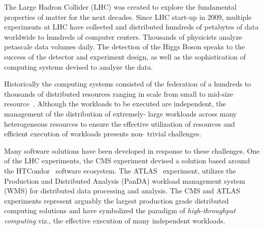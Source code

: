 The Large Hadron Collider (LHC) was created to explore the fundamental
properties of matter for the next decades.  Since LHC start-up in 2009,
multiple experiments  at LHC have collected and distributed hundreds of
petabytes of data worldwide to hundreds of computer centers. Thousands of
physicists analyze petascale data volumes daily. The detection of the Higgs
Boson speaks to the success of the detector and experiment design, as well as
the sophistication of computing systems devised to analyze the data.

Historically the computing systems consisted of the federation of a hundreds
to thousands of distributed resources \textemdash{} ranging in scale from
small to mid-size resource~\cite{foster2003grid}. Although the workloads to be
executed are independent, the management of the distribution of extremely-
large workloads across many heterogeneous resources to ensure the effective
utilization of resources and efficient execution of workloads presents non-
trivial challenges.

Many software solutions have been developed in response to these challenges.
One of the LHC experiments, the CMS experiment devised a solution based around
the HTCondor~\cite{XX} software ecosystem. The ATLAS~\cite{Aad:2008}
experiment, utilizes the Production and Distributed Analysis (PanDA) workload
management system~\cite{Maeno2011} (WMS) for distributed data processing and
analysis. The CMS and ATLAS experiments represent arguably the largest
production grade distributed computing solutions and have symbolized the
paradigm of {\it high-throughput computing} viz., the effective execution of
many independent workloads.






